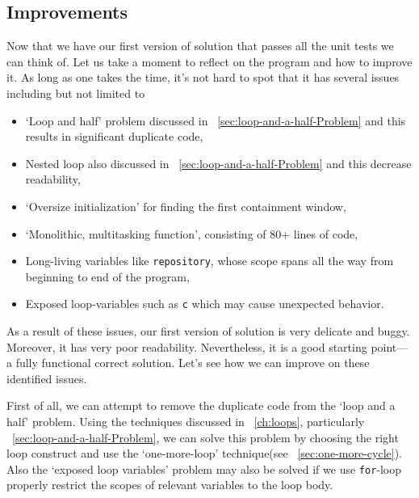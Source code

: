 \documentclass[oneside,11pt]{book}
\theoremstyle{definition}
\theoremstyle{remark}
\newcommand{\code}[1]{\mbox{\lstinline{#1}}}
\begin{document}
\subsection{Improvements}
Now that we have our first version of solution that passes all the unit tests we can think of.
Let us take a moment to reflect on the program and how to improve it.
As long as one takes the time, it's not hard to spot that
it has several issues including but not limited to
\begin{itemize}
    \item `Loop and half' problem discussed in ~\autoref{sec:loop-and-a-half-Problem} and this
    results in significant duplicate code,
    \item Nested loop also discussed in ~\autoref{sec:loop-and-a-half-Problem} and this
    decrease readability,
    \item `Oversize initialization' for finding the first containment window,
    \item `Monolithic, multitasking function', consisting of 80+ lines of code,
    \item Long-living variables like \code{repository}, whose scope spans all the way from
    beginning to end of the program,
    \item Exposed loop-variables such as \code{c} which may cause unexpected behavior.
\end{itemize}
As a result of these issues, our first version of solution is very delicate and buggy.
Moreover, it has very poor readability.
Nevertheless, it is a good starting point---a fully functional correct solution.
Let's see how we can improve on these identified issues.

First of all, we can attempt to remove the duplicate code from the `loop and a half' problem.
Using the techniques discussed in ~\autoref{ch:loops}, particularly
~\autoref{sec:loop-and-a-half-Problem}, we can solve this problem by choosing the right loop
construct and use the `one-more-loop' technique(see ~\autoref{sec:one-more-cycle}).
Also the `exposed loop variables' problem may also be solved if we use \code{for}-loop properly
restrict the scopes of relevant variables to the loop body.
\end{document}
